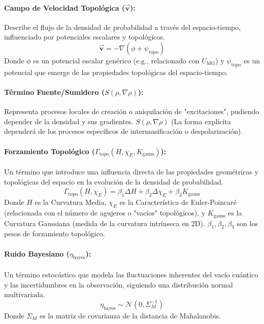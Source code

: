 \documentclass{book}
\newcommand{\bvec}[1]{\vec{\mathbf{#1}}} %
\begin{document}
\paragraph{Campo de Velocidad Topológica ($\bvec{v}$):} Describe el flujo de la densidad de probabilidad a través del espacio-tiempo, influenciado por potenciales escalares y topológicos.
\begin{equation}
    \bvec{v}=-\nabla(\phi+\psi_{\text{topo}})
\end{equation}
Donde $\phi$ es un potencial escalar genérico (e.g., relacionado con $U_{\text{MG}}$) y $\psi_{\text{topo}}$ es un potencial que emerge de las propiedades topológicas del espacio-tiempo.

\paragraph{Término Fuente/Sumidero ($S(\rho,\nabla\rho)$):} Representa procesos locales de creación o aniquilación de "excitaciones", pudiendo depender de la densidad y sus gradientes.
$S(\rho,\nabla\rho)$ (La forma explícita dependerá de los procesos específicos de intermasificación o despolarización).

\paragraph{Forzamiento Topológico ($\Gamma_{\text{topo}}(H,\chi_E,K_{\text{gauss}})$):} Un término que introduce una influencia directa de las propiedades geométricas y topológicas del espacio en la evolución de la densidad de probabilidad.
\begin{equation}
    \Gamma_{\text{topo}}(H,\chi_E)=\beta_1\Delta H+\beta_2\Delta\chi_E+\beta_3 K_{\text{gauss}}
\end{equation}
Donde $H$ es la Curvatura Media, $\chi_E$ es la Característica de Euler-Poincaré (relacionada con el número de agujeros o "vacíos" topológicos), y $K_{\text{gauss}}$ es la Curvatura Gaussiana (medida de la curvatura intrínseca en 2D). $\beta_1,\beta_2,\beta_3$ son los pesos de forzamiento topológico.

\paragraph{Ruido Bayesiano ($\eta_{\text{bayes}}$):} Un término estocástico que modela las fluctuaciones inherentes del vacío cuántico y las incertidumbres en la observación, siguiendo una distribución normal multivariada.
\begin{equation}
    \eta_{\text{bayes}}\sim\mathcal{N}(0,\Sigma_M^{-1})
\end{equation}
Donde $\Sigma_M$ es la matriz de covarianza de la distancia de Mahalanobis.
\end{document}
